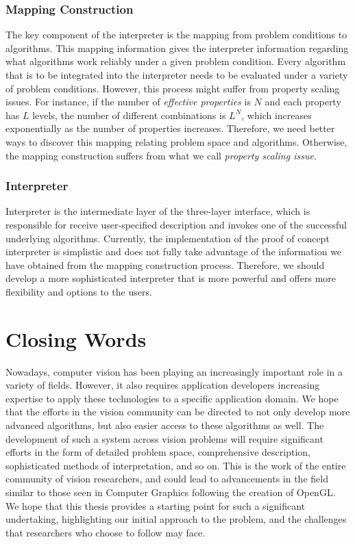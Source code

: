 \subsubsection{Mapping Construction}
The key component of the interpreter is the mapping from problem conditions to algorithms. This mapping information gives the interpreter information regarding what algorithms work reliably under a given problem condition. Every algorithm that is to be integrated into the interpreter needs to be evaluated under a variety of problem conditions. However, this process might suffer from property scaling issues. For instance, if the number of \textit{effective properties} is $N$ and each property has $L$ levels, the number of different combinations is $L^N$, which increases exponentially as the number of properties increases. Therefore, we need better ways to discover this mapping relating problem space and algorithms. Otherwise, the mapping construction suffers from what we call \textit{property scaling issue}.

\subsubsection{Interpreter}
Interpreter is the intermediate layer of the three-layer interface, which is responsible for receive user-specified description and invokes one of the successful underlying algorithms. Currently, the implementation of the proof of concept interpreter is simplistic and does not fully take advantage of the information we have obtained from the mapping construction process. Therefore, we should develop a more sophisticated interpreter that is more powerful and offers more flexibility and options to the users.

\section{Closing Words}
Nowadays, computer vision has been playing an increasingly important role in a variety of fields. However, it also requires application developers increasing expertise to apply these technologies to a specific application domain. We hope that the efforts in the vision community can be directed to not only develop more advanced algorithms, but also easier access to these algorithms as well. The development of such a system across vision problems will require significant efforts in the form of detailed problem space, comprehensive description, sophisticated methods of interpretation, and so on. This is the work of the entire community of vision researchers, and could lead to advancements in the field similar to those seen in Computer Graphics following the creation of OpenGL. We hope that this thesis provides a starting point for such a significant undertaking, highlighting our initial approach to the problem, and the challenges that researchers who choose to follow may face.
